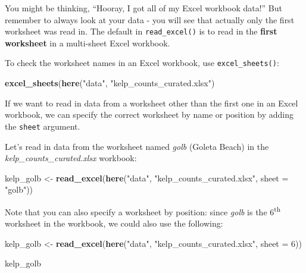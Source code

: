 \documentclass[]{book}
\newenvironment{Shaded}{\begin{snugshade}}{\end{snugshade}}
\newcommand{\DataTypeTok}[1]{\textcolor[rgb]{0.13,0.29,0.53}{#1}}
\newcommand{\DecValTok}[1]{\textcolor[rgb]{0.00,0.00,0.81}{#1}}
\newcommand{\KeywordTok}[1]{\textcolor[rgb]{0.13,0.29,0.53}{\textbf{#1}}}
\newcommand{\NormalTok}[1]{#1}
\newcommand{\StringTok}[1]{\textcolor[rgb]{0.31,0.60,0.02}{#1}}
\begin{document}
You might be thinking, ``Hooray, I got all of my Excel workbook data!'' But remember to always look at your data - you will see that actually only the first worksheet was read in. The default in \texttt{read\_excel()} is to read in the \textbf{first worksheet} in a multi-sheet Excel workbook.

To check the worksheet names in an Excel workbook, use \texttt{excel\_sheets()}:

\begin{Shaded}
\begin{Highlighting}[]
\KeywordTok{excel_sheets}\NormalTok{(}\KeywordTok{here}\NormalTok{(}\StringTok{"data"}\NormalTok{, }\StringTok{"kelp_counts_curated.xlsx"}\NormalTok{)}
\end{Highlighting}
\end{Shaded}

If we want to read in data from a worksheet other than the first one in an Excel workbook, we can specify the correct worksheet by name or position by adding the \texttt{sheet} argument.

Let's read in data from the worksheet named \emph{golb} (Goleta Beach) in the \emph{kelp\_counts\_curated.xlsx} workbook:

\begin{Shaded}
\begin{Highlighting}[]
\NormalTok{kelp_golb <-}\StringTok{ }\KeywordTok{read_excel}\NormalTok{(}\KeywordTok{here}\NormalTok{(}\StringTok{"data"}\NormalTok{, }\StringTok{"kelp_counts_curated.xlsx"}\NormalTok{, }\DataTypeTok{sheet =} \StringTok{"golb"}\NormalTok{))}
\end{Highlighting}
\end{Shaded}

Note that you can also specify a worksheet by position: since \emph{golb} is the 6\textsuperscript{th} worksheet in the workbook, we could also use the following:

\begin{Shaded}
\begin{Highlighting}[]
\NormalTok{kelp_golb <-}\StringTok{ }\KeywordTok{read_excel}\NormalTok{(}\KeywordTok{here}\NormalTok{(}\StringTok{"data"}\NormalTok{, }\StringTok{"kelp_counts_curated.xlsx"}\NormalTok{, }\DataTypeTok{sheet =} \DecValTok{6}\NormalTok{))}
\end{Highlighting}
\end{Shaded}

\begin{Shaded}
\begin{Highlighting}[]
\NormalTok{kelp_golb}
\end{Highlighting}
\end{Shaded}
\end{document}
